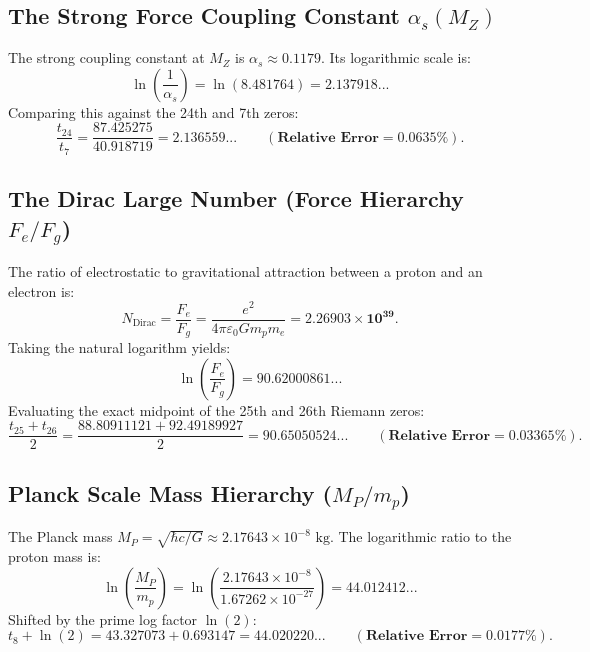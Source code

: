 \documentclass[11pt,a4paper]{article}
\begin{document}
\subsection{The Strong Force Coupling Constant \texorpdfstring{$\alpha_s(M_Z)$}{alpha_s(M_Z)}}
The strong coupling constant at $M_Z$ is $\alpha_s \approx 0.1179$. Its logarithmic scale is:
\begin{equation}
\ln\left(\frac{1}{\alpha_s}\right) = \ln(8.481764) = \mathbf{2.137918...}
\end{equation}
Comparing this against the 24th and 7th zeros:
\begin{equation}
\frac{t_{24}}{t_7} = \frac{87.425275}{40.918719} = \mathbf{2.136559...} \qquad (\mathbf{\text{Relative Error} = 0.0635\%}).
\end{equation}

\subsection{The Dirac Large Number (Force Hierarchy \texorpdfstring{$F_e / F_g$}{Fe / Fg})}
The ratio of electrostatic to gravitational attraction between a proton and an electron is:
\begin{equation}
N_{\text{Dirac}} = \frac{F_e}{F_g} = \frac{e^2}{4\pi\varepsilon_0 G m_p m_e} = \mathbf{2.26903 \times 10^{39}}.
\end{equation}
Taking the natural logarithm yields:
\begin{equation}
\ln\left(\frac{F_e}{F_g}\right) = \mathbf{90.62000861...}
\end{equation}
Evaluating the exact midpoint of the 25th and 26th Riemann zeros:
\begin{equation}
\frac{t_{25} + t_{26}}{2} = \frac{88.80911121 + 92.49189927}{2} = \mathbf{90.65050524...} \qquad (\mathbf{\text{Relative Error} = 0.03365\%}).
\end{equation}

\subsection{Planck Scale Mass Hierarchy (\texorpdfstring{$M_P / m_p$}{MP / mp})}
The Planck mass $M_P = \sqrt{\hbar c / G} \approx 2.17643 \times 10^{-8}\text{ kg}$. The logarithmic ratio to the proton mass is:
\begin{equation}
\ln\left(\frac{M_P}{m_p}\right) = \ln\left(\frac{2.17643 \times 10^{-8}}{1.67262 \times 10^{-27}}\right) = \mathbf{44.012412...}
\end{equation}
Shifted by the prime log factor $\ln(2)$:
\begin{equation}
t_8 + \ln(2) = 43.327073 + 0.693147 = \mathbf{44.020220...} \qquad (\mathbf{\text{Relative Error} = 0.0177\%}).
\end{equation}
\end{document}
